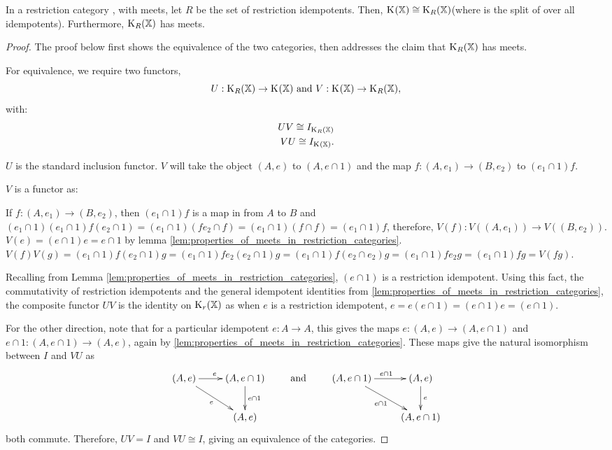 \begin{proposition}\label{pro:in_rc_x_with_meets_split_x_is_cong_to_split_r_x}
  In a restriction category \X, with meets, let $R$ be the set of restriction idempotents.
  Then, $\text{K}_{}(\mathbb{X}) \cong \text{K}_{R}(\mathbb{X})$(where \spl{}{\X} is the split of \X over all idempotents). 
  Furthermore, $\text{K}_{R}(\mathbb{X})$ has meets.
\end{proposition}
\begin{proof}
  The proof below first shows the equivalence of the two categories, then addresses the claim 
  that $\text{K}_{R}(\mathbb{X})$ has meets.

  For equivalence, we require two functors,
  \[
    U:\text{K}_{R}(\mathbb{X})\to\text{K}_{}(\mathbb{X})\text{ and }V:\text{K}_{}(\mathbb{X})\to\text{K}_{R}(\mathbb{X}),
  \]
  with:
  \begin{align}
    U V \cong I_{\text{K}_{R}(\mathbb{X})}\\
    V U \cong I_{\text{K}_{}(\mathbb{X})}.
  \end{align}


  $U$ is the standard inclusion functor. $V$ will take the object $(A,e)$ to
  $(A,e\cap 1)$ and the map $f:(A,e_1)\to (B,e_2)$ to $(e_1\cap 1)f $.

  $V$ is a functor as:
  \begin{description}
     If  $f:(A,e_1) \to (B,e_2)$, then
      $(e_1\cap 1) f $ is a map in \X from $A$ to $B$ and
      $ (e_1\cap 1)(e_1\cap 1) f  (e_2 \cap 1) =
      (e_1\cap 1) (f  e_2 \cap f ) = (e_1\cap 1) (f \cap f)= (e_1\cap 1) f$, therefore,
      $V(f):V((A,e_1)) \to V((B,e_2))$.
     $V(e) = (e\cap 1 ) e = e \cap 1$ by
      lemma \vref{lem:properties_of_meets_in_restriction_categories}.
     $V(f) V(g)
      = (e_1\cap 1 ) f (e_2 \cap 1) g
      = (e_1\cap 1 ) f e_2 (e_2 \cap 1) g
      = (e_1\cap 1 ) f  (e_2 \cap e_{2}) g
      = (e_1\cap 1 ) f e_2 g
      = (e_1\cap 1 ) f g
      = V(f g)$.
  \end{description}

  Recalling from Lemma \vref{lem:properties_of_meets_in_restriction_categories}, $(e\cap 1)$ 
  is a restriction idempotent. Using this fact, the commutativity of restriction idempotents
  and the general idempotent identities from  
  \vref{lem:properties_of_meets_in_restriction_categories}, the composite functor $U V$ is 
  the identity on $\text{K}_{r}(\mathbb{X})$ as when $e$ is a restriction idempotent,
  $e = e (e\cap 1) = (e\cap 1) e = (e\cap 1)$.

  For the other direction,  note that for a particular idempotent $e:A\to A$,  this gives the 
  maps $e:(A,e)\to(A,e\cap 1)$ and $e\cap 1 : (A,e\cap 1) \to (A,e)$, again by 
  \vref{lem:properties_of_meets_in_restriction_categories}. These maps give the natural 
  isomorphism between $I$ and $V U$ as
  \[
    \xymatrix{
      (A,e)\ar[r]^e \ar[dr]_{e} &(A,e\cap 1)\ar[d]^{e\cap 1}\\
      &(A,e) 
    }\qquad \text{ and  }\qquad
    \xymatrix{
      (A,e\cap 1)\ar[r]^{e\cap 1} \ar[dr]_{e\cap 1} &(A,e)\ar[d]^{e}\\
      &(A,e\cap 1) 
    }
  \]
  both commute. Therefore, $U V = I$ and $V U \cong I$, giving an equivalence of the categories.


\end{proof}
